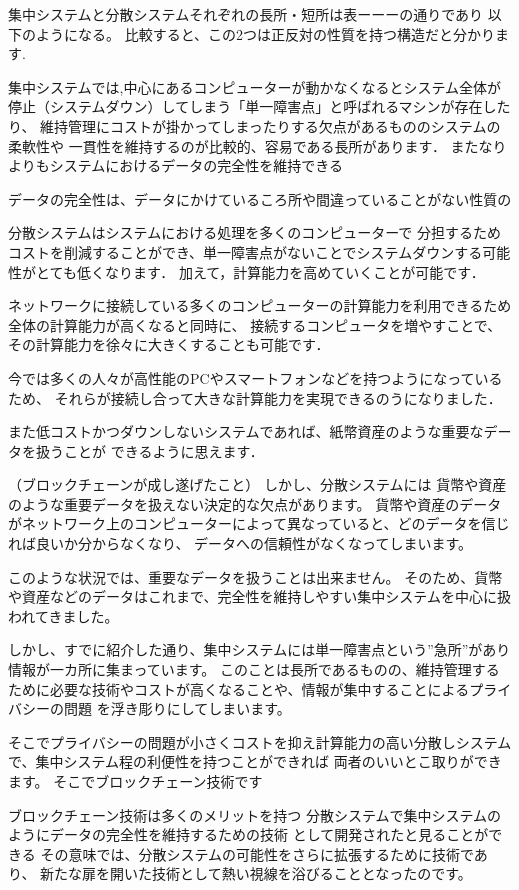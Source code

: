 \documentclass[a4paper,12pt]{jsarticle}
\begin{document}
集中システムと分散システムそれぞれの長所・短所は表ーーーの通りであり
以下のようになる。
比較すると、この2つは正反対の性質を持つ構造だと分かります.

集中システムでは,中心にあるコンピューターが動かなくなるとシステム全体が
停止（システムダウン）してしまう「単一障害点」と呼ばれるマシンが存在したり、
維持管理にコストが掛かってしまったりする欠点があるもののシステムの柔軟性や
一貫性を維持するのが比較的、容易である長所があります．
またなりよりもシステムにおけるデータの完全性を維持できる

データの完全性は、データにかけているころ所や間違っていることがない性質の

分散システムはシステムにおける処理を多くのコンピューターで
分担するためコストを削減することができ、単一障害点がないことでシステムダウンする可能性がとても低くなります．
加えて，計算能力を高めていくことが可能です．

ネットワークに接続している多くのコンピューターの計算能力を利用できるため全体の計算能力が高くなると同時に、
接続するコンピュータを増やすことで、その計算能力を徐々に大きくすることも可能です．

今では多くの人々が高性能のPCやスマートフォンなどを持つようになっているため、
それらが接続し合って大きな計算能力を実現できるのうになりました．

また低コストかつダウンしないシステムであれば、紙幣資産のような重要なデータを扱うことが
できるように思えます．

（ブロックチェーンが成し遂げたこと）
しかし、分散システムには
貨幣や資産のような重要データを扱えない決定的な欠点があります。
貨幣や資産のデータがネットワーク上のコンピューターによって異なっていると、どのデータを信じれば良いか分からなくなり、
データへの信頼性がなくなってしまいます。

このような状況では、重要なデータを扱うことは出来ません。
そのため、貨幣や資産などのデータはこれまで、完全性を維持しやすい集中システムを中心に扱われてきました。

しかし、すでに紹介した通り、集中システムには単一障害点という”急所”があり情報が一カ所に集まっています。
このことは長所であるものの、維持管理するために必要な技術やコストが高くなることや、情報が集中することによるプライバシーの問題
を浮き彫りにしてしまいます。

そこでプライバシーの問題が小さくコストを抑え計算能力の高い分散しシステムで、集中システム程の利便性を持つことができれば
両者のいいとこ取りができます。
そこでブロックチェーン技術です

ブロックチェーン技術は多くのメリットを持つ
分散システムで集中システムのようにデータの完全性を維持するための技術
として開発されたと見ることができる
その意味では、分散システムの可能性をさらに拡張するために技術であり、
新たな扉を開いた技術として熱い視線を浴びることとなったのです。
\end{document}

